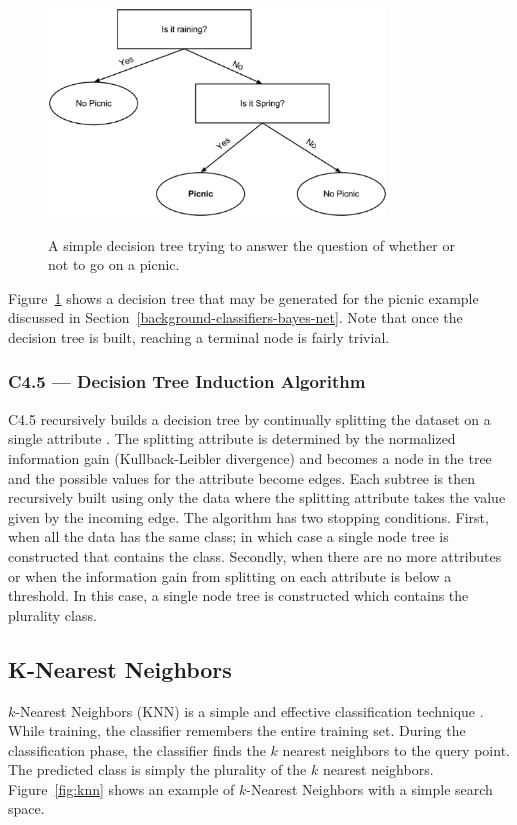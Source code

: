 \documentclass[12pt]{ucthesis}
\newcommand{\captionfonts}{\small\bf\ssp}
\begin{document}
\begin{figure}
   \begin{center}
      \includegraphics[width=0.8\textwidth]{images/Decision_Tree.eps}
      \captionfonts
      \caption[Simple Decision Tree]{A simple decision tree trying to answer the question of whether or not to go on a picnic.}
      \label{fig:decisionTree}
   \end{center}
\end{figure}

Figure~\ref{fig:decisionTree} shows a decision tree that may be generated for the picnic example discussed in Section~\ref{background-classifiers-bayes-net}.
Note that once the decision tree is built, reaching a terminal node is fairly trivial.

\subsubsection{C4.5 --- Decision Tree Induction Algorithm}
\label{background-classifiers-j48-c45}
C4.5 recursively builds a decision tree by continually splitting the dataset on a single attribute \cite{j48}.
The splitting attribute is determined by the normalized information gain (Kullback-Leibler divergence) and becomes a
node in the tree and the possible values for the attribute become edges. Each subtree is then recursively built using only the
data where the splitting attribute takes the value given by the incoming edge. The algorithm has two stopping conditions.
First, when all the data has the same class; in which case a single node tree is constructed that contains the class.
Secondly, when there are no more attributes or when the information gain from splitting on each attribute is below a threshold.
In this case, a single node tree is constructed which contains the plurality class.

\subsection{K-Nearest Neighbors}
\label{background-classifiers-knn}
$k$-Nearest Neighbors (KNN) is a simple and effective classification technique \cite{Duda}.
While training, the classifier remembers the entire training set.
During the classification phase, the classifier finds the $k$ nearest neighbors
to the query point. The predicted class is simply the plurality of the $k$ nearest neighbors.
Figure~\ref{fig:knn} shows an example of $k$-Nearest Neighbors with a simple search space.
\end{document}

